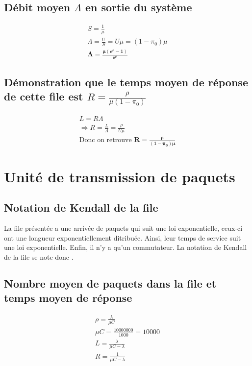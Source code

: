 \documentclass[12pt, a4paper]{article}
\begin{document}
\subsection{D\'ebit moyen $\Lambda$ en sortie du syst\`eme}

\begin{gather*}
S=\frac{1}{\mu} \\
\Lambda = \frac{U}{S} = U\mu = (1-\pi_{0})\mu \\
\bm{\Lambda = \frac{\mu(e^{\rho} - 1)}{e^{\rho}}}
\end{gather*}

\subsection{D\'emonstration que le temps moyen de r\'eponse de cette file est $R=\frac{\rho}{\mu(1-\pi_{0})}$}

\begin{gather*}
L=R\Lambda \\
\Rightarrow R = \frac{L}{\Lambda} = \frac{\rho}{U\mu} \\
\text{Donc on retrouve } \bm{R = \frac{\rho}{(1-\pi_{0})\mu}}
\end{gather*}

\newpage

\section{Unit\'e de transmission de paquets}
\subsection{Notation de Kendall de la file}

La file pr\'esent\'ee a une arriv\'ee de paquets qui suit une loi exponentielle, ceux-ci ont une longueur exponentiellement ditribu\'ee. Ainsi, leur temps de service suit une loi exponentielle. Enfin, il n'y a qu'un commutateur. La notation de Kendall de la file se note donc .

\subsection{Nombre moyen de paquets dans la file et temps moyen de r\'eponse}

\begin{gather*}
\rho=\frac{\lambda}{\mu C} \\
\mu C=\frac{10000000}{1000}=10000 \\
L=\frac{\lambda}{\mu C-\lambda} \\
R = \frac{1}{\mu C - \lambda}
\end{gather*}
\end{document}
